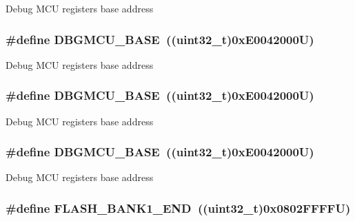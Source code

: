 Debug M\-C\-U registers base address \hypertarget{group___peripheral__memory__map_ga4adaf4fd82ccc3a538f1f27a70cdbbef}{
\subsubsection[{D\-B\-G\-M\-C\-U\-\_\-\-B\-A\-S\-E}]{\setlength{\rightskip}{0pt plus 5cm}\#define D\-B\-G\-M\-C\-U\-\_\-\-B\-A\-S\-E~((uint32\-\_\-t)0x\-E0042000\-U)}}\label{group___peripheral__memory__map_ga4adaf4fd82ccc3a538f1f27a70cdbbef}
Debug M\-C\-U registers base address \hypertarget{group___peripheral__memory__map_ga4adaf4fd82ccc3a538f1f27a70cdbbef}{
\subsubsection[{D\-B\-G\-M\-C\-U\-\_\-\-B\-A\-S\-E}]{\setlength{\rightskip}{0pt plus 5cm}\#define D\-B\-G\-M\-C\-U\-\_\-\-B\-A\-S\-E~((uint32\-\_\-t)0x\-E0042000\-U)}}\label{group___peripheral__memory__map_ga4adaf4fd82ccc3a538f1f27a70cdbbef}
Debug M\-C\-U registers base address \hypertarget{group___peripheral__memory__map_ga4adaf4fd82ccc3a538f1f27a70cdbbef}{
\subsubsection[{D\-B\-G\-M\-C\-U\-\_\-\-B\-A\-S\-E}]{\setlength{\rightskip}{0pt plus 5cm}\#define D\-B\-G\-M\-C\-U\-\_\-\-B\-A\-S\-E~((uint32\-\_\-t)0x\-E0042000\-U)}}\label{group___peripheral__memory__map_ga4adaf4fd82ccc3a538f1f27a70cdbbef}
Debug M\-C\-U registers base address \hypertarget{group___peripheral__memory__map_ga443a2786535d83e32dfdc2b29e379332}{
\subsubsection[{F\-L\-A\-S\-H\-\_\-\-B\-A\-N\-K1\-\_\-\-E\-N\-D}]{\setlength{\rightskip}{0pt plus 5cm}\#define F\-L\-A\-S\-H\-\_\-\-B\-A\-N\-K1\-\_\-\-E\-N\-D~((uint32\-\_\-t)0x0802\-F\-F\-F\-F\-U)}}\label{group___peripheral__memory__map_ga443a2786535d83e32dfdc2b29e379332}
